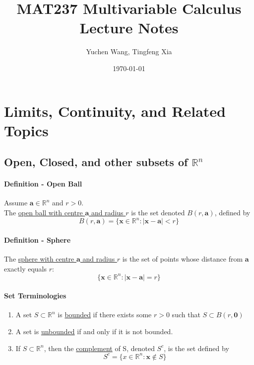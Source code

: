 \documentclass[11pt]{article}
\title{MAT237 Multivariable Calculus \\ Lecture Notes}
\author{Yuchen Wang, Tingfeng Xia}
\date{\today}
\newcommand{\tb}[1]{\textbf{#1}}
\newcommand{\real}[0]{\mathbb{R}}
\newcommand{\under}[1]{\underline{#1}}
\newcommand{\vx}[0]{\tb{x}}
\newcommand{\vo}[0]{\tb{0}}
\newcommand{\va}[0]{\tb{a}}
\begin{document}
    \maketitle
    \tableofcontents
    \newpage
\section{Limits, Continuity, and Related Topics}
\subsection{Open, Closed, and other subsets of $\real^n$}
\paragraph{Definition - Open Ball}
Assume $\va \in \real^n$ and $r > 0$. \\ The \under{open ball with centre $\va$ and radius $r$} is the set denoted $B(r, \va)$, defined by
$$ B(r, \va) = \{\vx \in \real^n: |\vx - \va| < r \}$$

\paragraph{Definition - Sphere}
The \under{sphere with centre $\va$ and radius $r$} is the set of points whose distance from $\va$ exactly equals $r$:
$$ \{ \vx \in \real^n : |\vx - \va| = r \}$$

\paragraph{Set Terminologies}
\begin{enumerate}
	\item A set $S \subset \real^n$ is \under{bounded} if there exists some $r > 0$ such that $S \subset B(r, \vo)$
	\item A set is \under{unbounded} if and only if it is not bounded.
	\item If $ S \subset \real^n$, then the \under{complement} of S, denoted $S^c$, is the set
	defined by $$ S^c = \{x \in \real^n: \vx \notin S\}$$
\end{enumerate}
\end{document}

